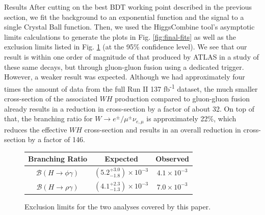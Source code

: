 \begin{section}{Results}
After cutting on the best BDT working point described in the previous section, we fit the background to an exponential function and the signal to a single Crystal Ball function. Then, we used the HiggsCombine tool's asymptotic limits calculations\cite{cite-hcomb} to generate the plots in Fig. \ref{fig:final-fits} as well as the exclusion limits listed in Fig. \ref{fig:exclude-lims} (at the 95\% confidence level). We see that our result is within one order of magnitude of that produced by ATLAS in a study\cite{cite-rpg-brs} of these same decays, but through gluon-gluon fusion using a dedicated trigger. However, a weaker result was expected. Although we had approximately four times the amount of data from the full Run II 137 fb\textsuperscript{-1} dataset, the much smaller cross-section of the associated $WH$ production compared to gluon-gluon fusion already results in a reduction in cross-section by a factor of about 32. On top of that, the branching ratio for $W\rightarrow e^{\pm}/\mu^{\pm}\nu_{e,\mu}$ is approximately 22\%, which reduces the effective $WH$ cross-section and results in an overall reduction in cross-section by a factor of 146.

\begin{figure}[htb]
\centering
\begin{tabular}{ccc}
\toprule
Branching Ratio & Expected & Observed \\
\midrule
$\mathcal{B}(H\rightarrow\phi\gamma)$ & $(5.2^{+3.0}_{-1.8})\times10^{-3}$ & $4.1\times10^{-3}$ \\
$\mathcal{B}(H\rightarrow\rho\gamma)$ & $(4.1^{+2.3}_{-1.3})\times10^{-3}$ & $7.0\times10^{-3}$ \\
\bottomrule
\end{tabular}
\caption{Exclusion limits for the two analyses covered by this paper.}
\label{fig:exclude-lims}
\end{figure}


\end{section}
